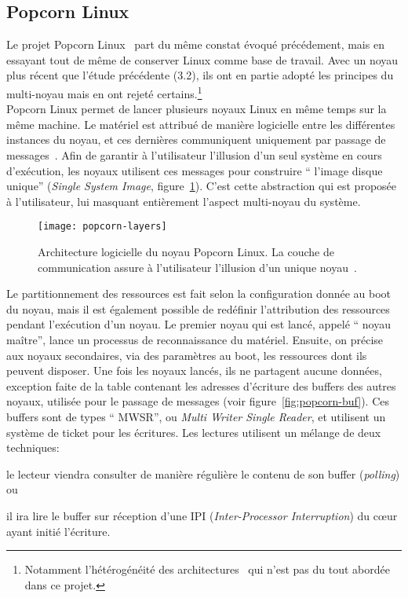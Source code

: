       
    \subsection{Popcorn Linux}

      Le projet Popcorn Linux~\citep{barbalacepopcorn} part du même constat
      évoqué précédement, mais en essayant tout de même de conserver Linux comme
      base de travail. Avec un noyau plus récent que l'étude précédente (3.2),
      ils ont en partie adopté les principes du multi-noyau mais en ont rejeté
      certains.\footnote{Notamment l'hétérogénéité des
        architectures~\citep{schupbach2008embracing} qui n'est pas du tout
        abordée dans ce projet.}\\

      Popcorn Linux permet de lancer plusieurs noyaux Linux en même temps sur la
      même machine. Le matériel est attribué de manière logicielle entre les
      différentes instances du noyau, et ces dernières communiquent uniquement
      par passage de messages~\citep{shelton2013popcorn}. Afin de garantir à
      l’utilisateur l’illusion d’un seul système en cours d'exécution, les
      noyaux utilisent ces messages pour construire `` l’image disque unique''
      (\textit{Single System Image}, figure~\ref{fig:popcorn-layers}). C'est
      cette abstraction qui est proposée à l'utilisateur, lui masquant
      entièrement l'aspect multi-noyau du système.

      \begin{figure}[ht]
        \centering
        \texttt{[image: popcorn-layers]}
        \caption{Architecture logicielle du noyau Popcorn Linux. La couche de
          communication assure à l'utilisateur l'illusion d'un unique
          noyau~\citep{barbalacepopcorn}.}
        \label{fig:popcorn-layers}
      \end{figure}

      Le partitionnement des ressources est fait selon la configuration donnée
      au boot du noyau, mais il est également possible de redéfinir
      l'attribution des ressources pendant l'exécution d'un noyau. Le premier
      noyau qui est lancé, appelé `` noyau maître'', lance un processus de
      reconnaissance du matériel. Ensuite, on précise aux noyaux secondaires,
      via des paramètres au boot, les ressources dont ils peuvent disposer. Une
      fois les noyaux lancés, ils ne partagent aucune données, exception faite
      de la table contenant les adresses d’écriture des buffers des autres
      noyaux, utilisée pour le passage de messages (voir
      figure~\ref{fig:popcorn-buf}). Ces buffers sont de types `` MWSR'', ou
      \textit{Multi Writer Single Reader}, et utilisent un système de ticket
      pour les écritures. Les lectures utilisent un mélange de deux
      techniques:\benumline \item le lecteur viendra consulter de manière
      régulière le contenu de son buffer (\textit{polling}) ou \item il ira lire
      le buffer sur réception d’une IPI (\textit{Inter-Processor Interruption})
      du c\oe ur ayant initié l’écriture\eenumline.

